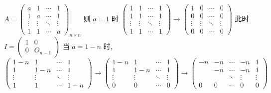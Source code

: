	 \paragraph{} %
		 $A = \begin{pmatrix}
				 a      & 1      & \cdots & 1      \\
				 1      & a      & \cdots & 1      \\
				 \vdots & \vdots & \ddots & \vdots \\
				 1      & 1      & \cdots & a
			 \end{pmatrix}_{n \times n}$
		 则 $a=1$ 时 $\begin{pmatrix}
				 1      & 1      & \cdots & 1      \\
				 1      & 1      & \cdots & 1      \\
				 \vdots & \vdots & \ddots & \vdots \\
				 1      & 1      & \cdots & 1
			 \end{pmatrix} \to \begin{pmatrix}
				 1      & 0      & \cdots & 0      \\
				 0      & 0      & \cdots & 0      \\
				 \vdots & \vdots & \ddots & \vdots \\
				 0      & 0      & \cdots & 0
			 \end{pmatrix}$
		 此时 $I = \begin{pmatrix}
				 1 & 0       \\
				 0 & O_{n-1}
			 \end{pmatrix}$
		 当 $a=1-n$ 时, $\begin{pmatrix}
				 1-n    & 1      & \cdots & 1      \\
				 1      & 1-n    & \cdots & 1      \\
				 \vdots & \vdots & \ddots & \vdots \\
				 1      & 1      & \cdots & 1-n
			 \end{pmatrix} \to \begin{pmatrix}
				 1-n    & 1      & \cdots & 1      \\
				 1      & 1-n    & \cdots & 1      \\
				 \vdots & \vdots & \ddots & \vdots \\
				 0      & 0      & \cdots & 0
			 \end{pmatrix} \to \begin{pmatrix}
				 -n & -n & \cdots & -n     & 1      \\
				    & -n & \cdots & -n     & 1      \\
				    &    & \ddots & \vdots & \vdots \\
				 0  & 0  & \cdots & 0      & 0
			 \end{pmatrix}$
